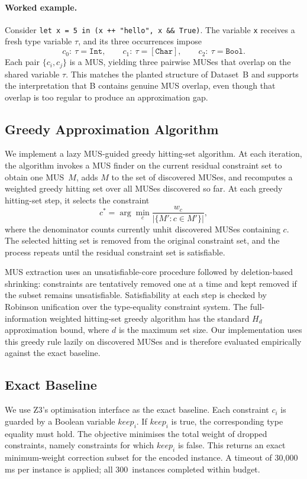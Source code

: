 \paragraph{Worked example.}
Consider \texttt{let x = 5 in (x ++ "hello", x \&\& True)}. The variable
\texttt{x} receives a fresh type variable $\tau$, and its three occurrences
impose
\[
c_0:\ \tau = \mathtt{Int}, \qquad
c_1:\ \tau = [\mathtt{Char}], \qquad
c_2:\ \tau = \mathtt{Bool}.
\]
Each pair $\{c_i, c_j\}$ is a MUS, yielding three pairwise MUSes that overlap
on the shared variable $\tau$. This matches the planted structure of
Dataset~B and supports the interpretation that B contains genuine MUS
overlap, even though that overlap is too regular to produce an approximation
gap.
\subsection{Greedy Approximation Algorithm}

We implement a lazy MUS-guided greedy hitting-set algorithm.
At each iteration, the algorithm invokes a MUS finder on the current residual
constraint set to obtain one MUS~$M$, adds $M$ to the set of discovered MUSes,
and recomputes a weighted greedy hitting set over all MUSes discovered so far.
At each greedy hitting-set step, it selects the constraint
\[
c^* = \arg\min_c \frac{w_c}{|\{M' : c \in M'\}|},
\]
where the denominator counts currently unhit discovered MUSes containing $c$.
The selected hitting set is removed from the original constraint set, and the
process repeats until the residual constraint set is satisfiable.

MUS extraction uses an unsatisfiable-core procedure followed by deletion-based
shrinking: constraints are tentatively removed one at a time and kept removed
if the subset remains unsatisfiable.
Satisfiability at each step is checked by Robinson unification over the
type-equality constraint system.
The full-information weighted hitting-set greedy algorithm has the standard
$H_d$ approximation bound, where $d$ is the maximum set size.
Our implementation uses this greedy rule lazily on discovered MUSes and is
therefore evaluated empirically against the exact baseline.

\subsection{Exact Baseline}

We use Z3's optimisation interface as the exact baseline.
Each constraint $c_i$ is guarded by a Boolean variable $\mathit{keep}_i$.
If $\mathit{keep}_i$ is true, the corresponding type equality must hold.
The objective minimises the total weight of dropped constraints, namely
constraints for which $\mathit{keep}_i$ is false.
This returns an exact minimum-weight correction subset for the encoded instance.
A timeout of 30{,}000\,ms per instance is applied; all 300~instances completed
within budget.

